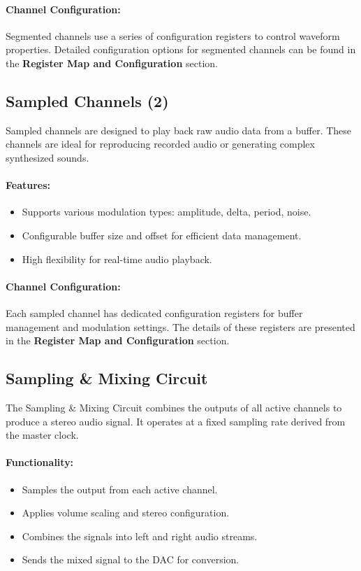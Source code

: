 \paragraph{Channel Configuration:}
Segmented channels use a series of configuration registers to control waveform properties. Detailed configuration options for segmented channels can be found in the \textbf{Register Map and Configuration} section.

\subsection{Sampled Channels (2)}
Sampled channels are designed to play back raw audio data from a buffer. These channels are ideal for reproducing recorded audio or generating complex synthesized sounds.

\paragraph{Features:}
\begin{itemize}
    \item Supports various modulation types: amplitude, delta, period, noise.
    \item Configurable buffer size and offset for efficient data management.
    \item High flexibility for real-time audio playback.
\end{itemize}

\paragraph{Channel Configuration:}
Each sampled channel has dedicated configuration registers for buffer management and modulation settings. The details of these registers are presented in the \textbf{Register Map and Configuration} section.

\subsection{Sampling \& Mixing Circuit}
The Sampling \& Mixing Circuit combines the outputs of all active channels to produce a stereo audio signal. It operates at a fixed sampling rate derived from the master clock.

\paragraph{Functionality:}
\begin{itemize}
    \item Samples the output from each active channel.
    \item Applies volume scaling and stereo configuration.
    \item Combines the signals into left and right audio streams.
    \item Sends the mixed signal to the DAC for conversion.
\end{itemize}

